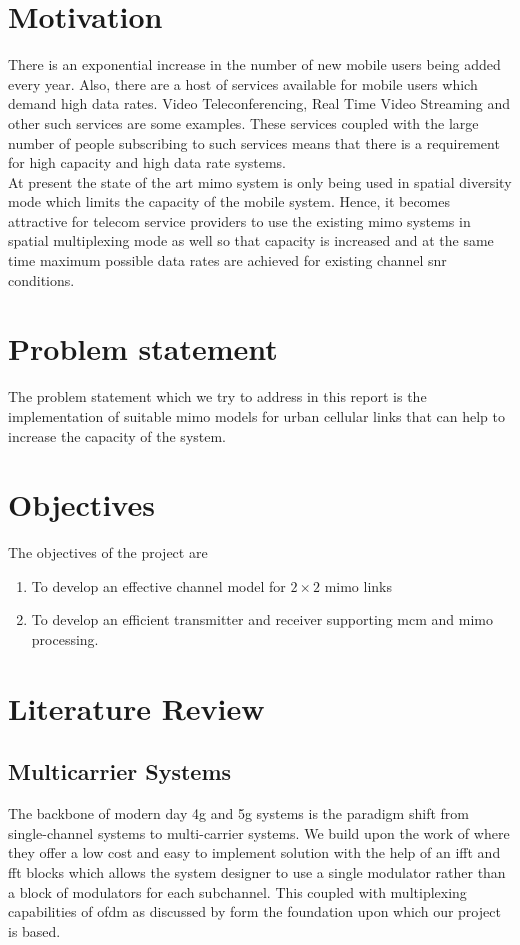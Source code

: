 \section[Motivation]{\textbf{Motivation}}
There is an exponential increase in the number of new mobile users being added every year. Also, there are a host of services available for mobile users which demand high data rates. Video Teleconferencing, Real Time Video Streaming and other such services are some examples. These services coupled with the large number of people subscribing to such services means that there is a requirement for high capacity and high data rate systems.\\

At present the state of the art \acrshort{mimo} system is only being used in \gls{spatial diversity} mode which limits the capacity of the mobile system. Hence, it becomes attractive for telecom service providers to use the existing \acrshort{mimo} systems in \gls{spatial multiplexing} mode as well so that capacity is increased and at the same time maximum possible data rates are achieved for existing channel \acrshort{snr} conditions.  

\section[Problem statement]{\textbf{Problem statement}}
The problem statement which we try to address in this report is the implementation of suitable \acrshort{mimo} models for urban cellular links that can help to increase the capacity of the system.

\section[Objectives]{\textbf{Objectives}}
The objectives of the project are
\begin{enumerate}
\item To develop an effective channel model for $2 \times 2$ \acrshort{mimo} links
\item To develop an efficient transmitter and receiver supporting \acrshort{mcm} and \acrshort{mimo} processing.
\end{enumerate}

\section{Literature Review}

\subsection{Multicarrier Systems}
The backbone of modern day \acrshort{4g} and \acrshort{5g} systems is the paradigm shift from single-channel systems to multi-carrier systems. We build upon the work of \textcite{Weinstein and Ebert} where they offer a low cost and easy to implement solution with the help of an \acrshort{ifft} and \acrshort{fft} blocks which allows the system designer to use a single modulator rather than a block of modulators for each subchannel. This coupled with multiplexing capabilities of \acrshort{ofdm} as discussed by \textcite{Wu and Zou} form the foundation upon which our project is based.
 
